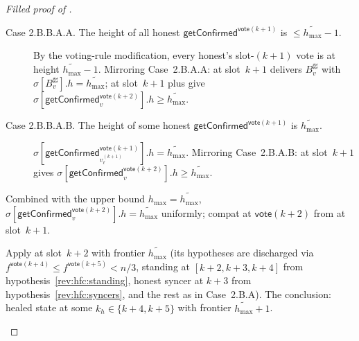 \ifx\litemode\undefined\documentclass{article}\fi
\newcommand{\hmax}{\ensuremath{h_{\max}}\xspace}
\newcommand{\vote}{\ensuremath{\mathsf{vote}}}
\newcommand{\comm}[1]{\ensuremath{\widetilde{#1}}}
\newcommand{\getConfirmed}{\textsf{getConfirmed}\xspace}
\theoremstyle{plain}
\theoremstyle{definition}
\theoremstyle{remark}
\begin{document}
\begin{proof}[Filled proof of ]
\begin{description}[style=nextline]
\begin{description}[style=nextline]
\begin{description}[style=nextline]
\begin{description}
            \begin{description}
              \item[Case 2.B.B.A.A. The height of all honest $\getConfirmed^{\vote(k+1)}$ is $\leq \comm{\hmax}-1$.]
                By the voting-rule modification, every honest's slot-$(k+1)$ vote is at height $\comm{\hmax}-1$.
                Mirroring Case~2.B.A.A:  at slot~$k+1$ delivers $B^{\sharp\sharp}_v$ with $\sigma[B^{\sharp\sharp}_v].h = \comm{\hmax}$;
                 at slot~$k+1$ plus  give $\sigma[\getConfirmed_v^{\vote(k+2)}].h \geq \comm{\hmax}$.

              \item[Case 2.B.B.A.B. The height of some honest $\getConfirmed^{\vote(k+1)}$ is $\comm{\hmax}$.]
                $\sigma[\getConfirmed_{v_\ell^{(k+1)}}^{\vote(k+1)}].h = \comm{\hmax}$.
                Mirroring Case~2.B.A.B:  at slot~$k+1$ gives $\sigma[\getConfirmed_v^{\vote(k+2)}].h \geq \comm{\hmax}$.
            \end{description}

            Combined with the upper bound $\hmax = \comm{\hmax}$, $\sigma[\getConfirmed_v^{\vote(k+2)}].h = \comm{\hmax}$ uniformly;
            compat at $\vote(k+2)$ from  at slot~$k+1$.

            Apply  at slot~$k+2$ with frontier $\comm{\hmax}$ (its hypotheses are discharged via $f^{\vote(k+4)} \leq f^{\vote(k+5)} < n/3$, standing at $[k+2, k+3, k+4]$ from hypothesis~\ref{rev:hfc:standing}, honest syncer at $k+3$ from hypothesis~\ref{rev:hfc:syncers}, and the rest as in Case~2.B.A).
            The conclusion: healed state at some $k_h \in \{k+4, k+5\}$ with frontier $\comm{\hmax}+1$.


\end{description}
\end{description}
\end{description}
\end{description}
\end{proof}
\end{document}
